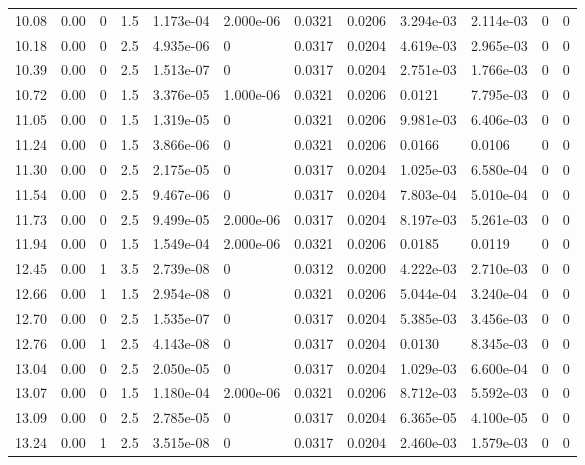 \documentclass[preview]{standalone}
\begin{document}
{{{\begin{tabular}{L{1.2cm}C{1.2cm} C{0.3cm}C{0.5cm} C{1.4cm}C{1.4cm} C{1.4cm}C{1.4cm} C{1.6cm}C{1.6cm} C{1.6cm}C{1.6cm}}
  10.08  &  0.00  & 0     & 1.5 &  1.173e-04  & 2.000e-06  &  0.0321&   0.0206& 3.294e-03 & 2.114e-03   &  0 & 0  \\ 
  10.18  &  0.00  & 0     & 2.5 &  4.935e-06  & 0  &  0.0317&   0.0204& 4.619e-03 & 2.965e-03   &  0 & 0  \\ 
  10.39  &  0.00  & 0     & 2.5 &  1.513e-07  & 0  &  0.0317&   0.0204& 2.751e-03 & 1.766e-03   &  0 & 0  \\ 
  10.72  &  0.00  & 0     & 1.5 &  3.376e-05  & 1.000e-06  &  0.0321&   0.0206& 0.0121 & 7.795e-03   &  0 & 0  \\ 
  11.05  &  0.00  & 0     & 1.5 &  1.319e-05  & 0  &  0.0321&   0.0206& 9.981e-03 & 6.406e-03   &  0 & 0  \\ 
  11.24  &  0.00  & 0     & 1.5 &  3.866e-06  & 0  &  0.0321&   0.0206& 0.0166 & 0.0106   &  0 & 0  \\ 
  11.30  &  0.00  & 0     & 2.5 &  2.175e-05  & 0  &  0.0317&   0.0204& 1.025e-03 & 6.580e-04   &  0 & 0  \\ 
  11.54  &  0.00  & 0     & 2.5 &  9.467e-06  & 0  &  0.0317&   0.0204& 7.803e-04 & 5.010e-04   &  0 & 0  \\ 
  11.73  &  0.00  & 0     & 2.5 &  9.499e-05  & 2.000e-06  &  0.0317&   0.0204& 8.197e-03 & 5.261e-03   &  0 & 0  \\ 
  11.94  &  0.00  & 0     & 1.5 &  1.549e-04  & 2.000e-06  &  0.0321&   0.0206& 0.0185 & 0.0119   &  0 & 0  \\ 
  12.45  &  0.00  & 1     & 3.5 &  2.739e-08  & 0  &  0.0312&   0.0200& 4.222e-03 & 2.710e-03   &  0 & 0  \\ 
  12.66  &  0.00  & 1     & 1.5 &  2.954e-08  & 0  &  0.0321&   0.0206& 5.044e-04 & 3.240e-04   &  0 & 0  \\ 
  12.70  &  0.00  & 0     & 2.5 &  1.535e-07  & 0  &  0.0317&   0.0204& 5.385e-03 & 3.456e-03   &  0 & 0  \\ 
  12.76  &  0.00  & 1     & 2.5 &  4.143e-08  & 0  &  0.0317&   0.0204& 0.0130 & 8.345e-03   &  0 & 0  \\ 
  13.04  &  0.00  & 0     & 2.5 &  2.050e-05  & 0  &  0.0317&   0.0204& 1.029e-03 & 6.600e-04   &  0 & 0  \\ 
  13.07  &  0.00  & 0     & 1.5 &  1.180e-04  & 2.000e-06  &  0.0321&   0.0206& 8.712e-03 & 5.592e-03   &  0 & 0  \\ 
  13.09  &  0.00  & 0     & 2.5 &  2.785e-05  & 0  &  0.0317&   0.0204& 6.365e-05 & 4.100e-05   &  0 & 0  \\ 
  13.24  &  0.00  & 1     & 2.5 &  3.515e-08  & 0  &  0.0317&   0.0204& 2.460e-03 & 1.579e-03   &  0 & 0  \\ 

\end{tabular}}}}
\end{document}
